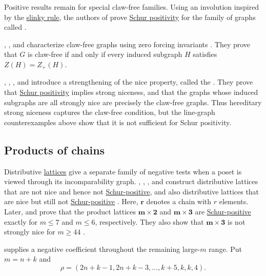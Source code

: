Positive results remain for special claw-free families.  Using an involution
inspired by the \hyperref[gesselSlinkyRule]{slinky rule}, the authors of
\cite{ShelburneWilligenburg2024x} prove
\hyperref[schurPositiveDefinition]{Schur positivity} for the family of graphs
called \label{generalizedNets}.

, , and 
characterize claw-free graphs using zero forcing invariants
\cite{DavilaSchuergerSmall2024x}.  They prove that $G$ is claw-free if and
only if every induced subgraph $H$ satisfies $Z(H)=Z_+(H)$.

, , ,
and  introduce a strengthening of the nice property,
called the \label{stronglyNiceProperty}
\cite{LiLiYangZhang2024x}.
They prove that \hyperref[schurPositiveDefinition]{Schur positivity} implies
strong niceness, and that the
graphs whose induced subgraphs are all strongly nice are precisely the
claw-free graphs.  Thus hereditary strong niceness captures the claw-free
condition, but the line-graph counterexamples above show that it is not
sufficient for Schur positivity.


\subsection[chromaticProductsOfChains]{Products of chains}

Distributive \hyperref[latticePoset]{lattices} give a separate family of
negative tests when a poset
is viewed through its incomparability graph.  ,
, , and 
construct distributive lattices that are not nice and hence not
\hyperref[schurPositiveDefinition]{Schur-positive}, and also distributive lattices
that are nice but still not
\hyperref[schurPositiveDefinition]{Schur-positive} \cite{LiQiuYangZhang2024x}.
Here, $\mathbf{r}$ denotes a chain with $r$ elements.  Later,
 and  prove that the product lattices
$\mathbf{m}\times\mathbf{2}$ and $\mathbf{m}\times\mathbf{3}$ are
\hyperref[schurPositiveDefinition]{Schur-positive} exactly for $m\leq7$ and
$m\leq6$, respectively.  They also show that
$\mathbf{m}\times\mathbf{3}$ is not strongly nice for $m\geq44$
\cite{WangZhang2025x}.

 supplies a negative coefficient throughout the remaining
large-$m$ range.  Put $m=n+k$ and
\[
\rho=(2n+k-1,2n+k-3,\dotsc,k+5,k,k,4).
\]

